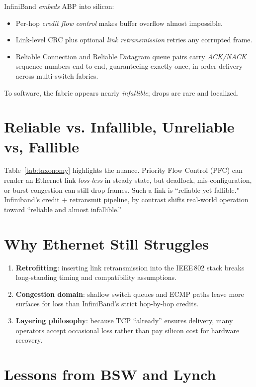 \documentclass[../../../OAE-SPEC-MAIN.tex]{subfiles}
\begin{document}
InfiniBand \emph{embeds} ABP into silicon:

\begin{itemize}
\item Per-hop \emph{credit flow control} makes buffer overflow almost
      impossible.
\item Link-level CRC plus optional \emph{link retransmission} retries any
      corrupted frame.
\item Reliable Connection and Reliable Datagram queue pairs carry
      \emph{ACK/NACK} sequence numbers end-to-end, guaranteeing exactly-once,
      in-order delivery across multi-switch fabrics.
\end{itemize}

To software, the fabric appears nearly \emph{infallible}; drops are rare and localized.

\section{Reliable vs. Infallible, Unreliable vs, Fallible}

Table~\ref{tab:taxonomy} highlights the nuance.  Priority Flow Control (PFC)
can render an Ethernet link \emph{loss-less} in steady state, but deadlock,
mis-configuration, or burst congestion can still drop frames.  Such a link is
``reliable yet fallible." Infiniband's credit + retransmit pipeline, by contrast
shifts real-world operation toward ``reliable and almost infallible.''

\section{Why Ethernet Still Struggles}

\begin{enumerate}
\item \textbf{Retrofitting}: inserting link retransmission into the IEEE\,802
      stack breaks long-standing timing and compatibility assumptions.
\item \textbf{Congestion domain}: shallow switch queues and ECMP paths leave
      more surfaces for loss than InfiniBand’s strict hop-by-hop credits.
\item \textbf{Layering philosophy}: because TCP ``already'' ensures delivery,
      many operators accept occasional loss rather than pay silicon cost for
      hardware recovery.
\end{enumerate}

\section{Lessons from BSW and Lynch}
\end{document}
